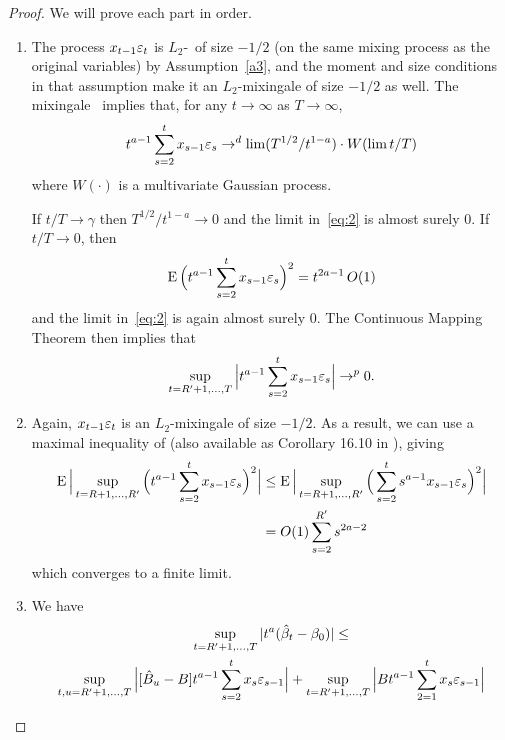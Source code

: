 \documentclass[12pt,fleqn]{article}
\begin{document}
\begin{proof}
  We will prove each part in order.
  \begin{enumerate}
  \item The process $x_{t-1} \varepsilon_t$ is $L_2$-\ned\ of size $-1/2$ (on
    the same mixing process as the original variables) by
    Assumption~\ref{a3}, and the moment and size conditions in that
    assumption make it an $L_2$-mixingale of size $-1/2$ as well. The
    mixingale \fclt\ implies that, for any $t \to \infty$ as $T \to \infty$,
    \begin{equation}\label{eq:2}
      t^{a - 1} \sum_{s=2}^t x_{s-1} \varepsilon_s \to^d \lim (T^{1/2} / t^{1-a}) \cdot W(\lim t/T)
    \end{equation}
    where $W(\cdot)$ is a multivariate Gaussian process.

    If $t/T \to \gamma$ then $T^{1/2} / t^{1-a} \to 0$ and the limit
    in~\eqref{eq:2} is almost surely 0. If $t/T \to 0$, then
    \begin{equation*}
      \operatorname{E}\Big( t^{a - 1} \sum_{s=2}^t x_{s-1} \varepsilon_s \Big)^2 = t^{2a - 1}\, O(1)
    \end{equation*}
    and the limit in~\eqref{eq:2} is again almost surely 0. The
    Continuous Mapping Theorem then implies that
    \begin{equation*}
      \sup_{t=R'+1,\dots,T} \Big| t^{a - 1} \sum_{s=2}^t x_{s-1} \varepsilon_s \Big| \to^p 0.
    \end{equation*}
  \item Again, $x_{t-1} \varepsilon_t$ is an $L_2$-mixingale of size
    $-1/2$. As a result, we can use a maximal inequality of
    \cite{Mcl:75} (also available as Corollary 16.10 in
    \citealp{Dav:94}), giving
    \begin{align*}
      \operatorname{E} \Big\lvert \sup_{t=R+1,\dots,R'} \Big(t^{a - 1} \sum_{s=2}^t x_{s-1} \varepsilon_s\Big)^2 \Big\rvert
      &\leq \operatorname{E} \Big\lvert \sup_{t=R+1,\dots,R'} \Big(\sum_{s=2}^t s^{a-1} x_{s-1} \varepsilon_s\Big)^2 \Big\rvert \\
      &= O(1) \sum_{s=2}^{R'} s^{2a - 2}
    \end{align*}
    which converges to a finite limit.
  \item We have
    \begin{multline*}
      \sup_{t=R'+1,\dots,T} | t^a (\hat{\beta}_t - \btrue) | \leq \\
      \sup_{t,u =R'+1,\dots,T} \Big| [ \hat{B}_u - B]
      t^{a-1} \sum_{s=2}^t x_s \ep_{s-1} \Big| + \sup_{t = R'+1,\dots,T} \Big|
      B t^{a-1} \sum_{2=1}^t x_s \ep_{s-1} \Big|

\end{multline*}
\end{enumerate}
\end{proof}
\end{document}
